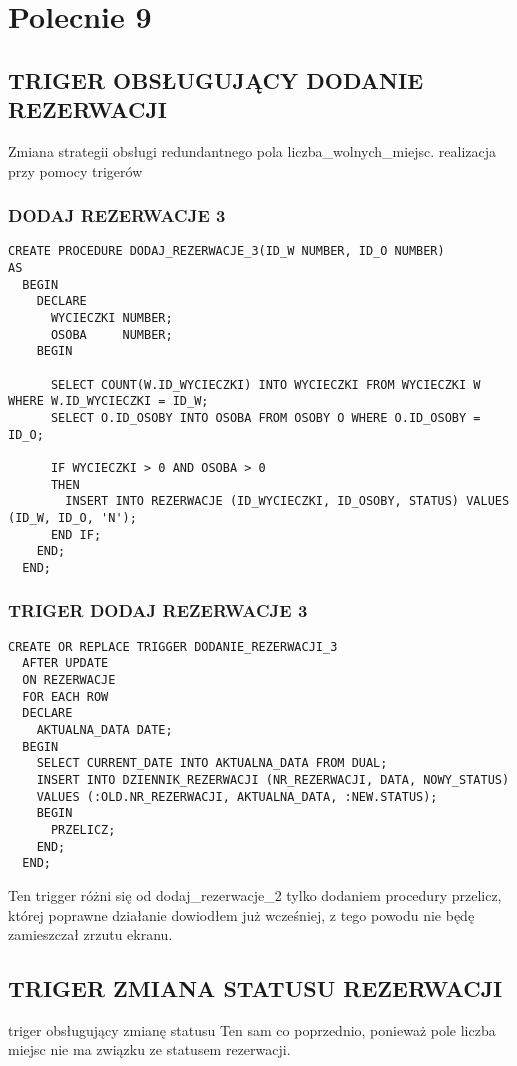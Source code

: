 \newpage

\section{Polecnie 9}

\subsection{TRIGER OBSŁUGUJĄCY DODANIE REZERWACJI}
Zmiana strategii obsługi redundantnego pola liczba\_wolnych\_miejsc. realizacja przy pomocy
trigerów
\subsubsection{DODAJ REZERWACJE 3}
\begin{verbatim}
CREATE PROCEDURE DODAJ_REZERWACJE_3(ID_W NUMBER, ID_O NUMBER)
AS
  BEGIN
    DECLARE
      WYCIECZKI NUMBER;
      OSOBA     NUMBER;
    BEGIN

      SELECT COUNT(W.ID_WYCIECZKI) INTO WYCIECZKI FROM WYCIECZKI W WHERE W.ID_WYCIECZKI = ID_W;
      SELECT O.ID_OSOBY INTO OSOBA FROM OSOBY O WHERE O.ID_OSOBY = ID_O;

      IF WYCIECZKI > 0 AND OSOBA > 0
      THEN
        INSERT INTO REZERWACJE (ID_WYCIECZKI, ID_OSOBY, STATUS) VALUES (ID_W, ID_O, 'N');
      END IF;
    END;
  END;
\end{verbatim}

\subsubsection{TRIGER DODAJ REZERWACJE 3}
\begin{verbatim}
CREATE OR REPLACE TRIGGER DODANIE_REZERWACJI_3
  AFTER UPDATE
  ON REZERWACJE
  FOR EACH ROW
  DECLARE
    AKTUALNA_DATA DATE;
  BEGIN
    SELECT CURRENT_DATE INTO AKTUALNA_DATA FROM DUAL;
    INSERT INTO DZIENNIK_REZERWACJI (NR_REZERWACJI, DATA, NOWY_STATUS)
    VALUES (:OLD.NR_REZERWACJI, AKTUALNA_DATA, :NEW.STATUS);
    BEGIN
      PRZELICZ;
    END;
  END;
\end{verbatim}

Ten trigger różni się od dodaj\_rezerwacje\_2 tylko dodaniem procedury przelicz, której poprawne 
działanie dowiodłem już wcześniej, z tego powodu nie będę zamieszczał zrzutu ekranu. 

\subsection{TRIGER ZMIANA STATUSU REZERWACJI}
triger obsługujący zmianę statusu
Ten sam co poprzednio, ponieważ pole liczba miejsc nie ma związku ze statusem rezerwacji.

